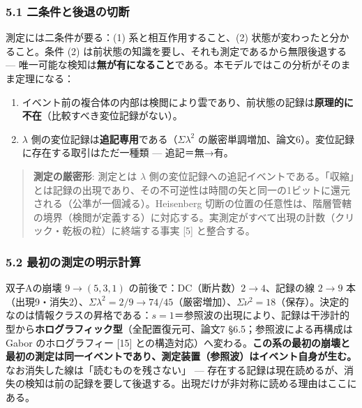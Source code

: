 \documentclass[
]{ltjsarticle}
\providecommand{\tightlist}{%
  \setlength{\itemsep}{0pt}\setlength{\parskip}{0pt}}
\begin{document}
\subsubsection{5.1
二条件と後退の切断}\label{ux4e8cux6761ux4ef6ux3068ux5f8cux9000ux306eux5207ux65ad}

測定には二条件が要る：(1) 系と相互作用すること、(2)
状態が変わったと分かること。条件 (2)
は前状態の知識を要し、それも測定であるから無限後退する ---
唯一可能な検知は\textbf{無が有になること}である。本モデルではこの分析がそのまま定理になる：

\begin{enumerate}
\def\labelenumi{\arabic{enumi}.}
\tightlist
\item
  イベント前の複合体の内部は検閲により雲であり、前状態の記録は\textbf{原理的に不在}（比較すべき変位記録がない）。
\item
  \(\lambda\) 側の変位記録は\textbf{追記専用}である（\(\Sigma\lambda^2\)
  の厳密単調増加、論文6）。変位記録に存在する取引はただ一種類 ---
  追記＝無→有。
\end{enumerate}

\begin{quote}
\textbf{測定の厳密形}: 測定とは \(\lambda\)
側の変位記録への追記イベントである。「収縮」とは記録の出現であり、その不可逆性は時間の矢と同一の1ビットに還元される（公準が一個減る）。Heisenberg
切断の位置の任意性は、階層管轄の境界（検閲が定義する）に対応する。実測定がすべて出現の計数（クリック・乾板の粒）に終端する事実
{[}5{]} と整合する。
\end{quote}

\subsubsection{5.2
最初の測定の明示計算}\label{ux6700ux521dux306eux6e2cux5b9aux306eux660eux793aux8a08ux7b97}

双子Aの崩壊 \(9\to(5,3,1)\) の前後で：DC（断片数）\(2\to4\)、記録の線
\(2\to9\)
本（出現9・消失2）、\(\Sigma\lambda^2=2/9\to74/45\)（厳密増加）、\(\Sigma\nu^2=18\)（保存）。決定的なのは情報クラスの昇格である：\(s=1\)＝参照波の出現により、記録は干渉計的型から\textbf{ホログラフィック型}（全配置復元可、論文7
§6.5；参照波による再構成は Gabor のホログラフィー {[}15{]}
との構造対応）へ変わる。\textbf{この系の最初の崩壊と最初の測定は同一イベントであり、測定装置（参照波）はイベント自身が生む。}
なお消失した線は「読むものを残さない」 ---
存在する記録は現在読めるが、消失の検知は前の記録を要して後退する。出現だけが非対称に読める理由はここにある。
\end{document}
